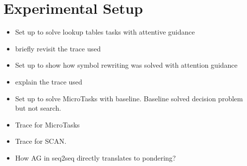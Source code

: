 \chapter{Experimental Setup}
\begin{itemize}
	\item Set up to solve lookup tables tasks with attentive guidance
	\item briefly revisit the trace used
	\item Set up to show how symbol rewriting was solved with attention guidance
	\item explain the trace used
	\item Set up to solve MicroTasks with baseline. Baseline solved decision problem but not search.
	\item Trace for MicroTasks
	\item Trace for SCAN.
	\item How AG in seq2seq directly translates to pondering?
\end{itemize}
